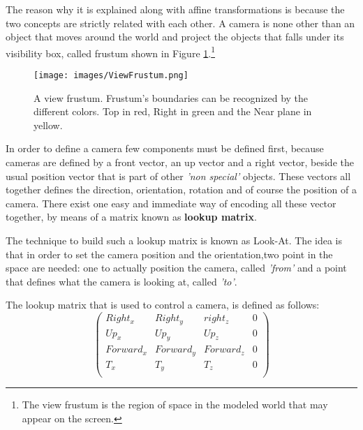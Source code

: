 \documentclass[12pt,a4paper]{extarticle}
\newcommand{\linespace}{\vspace{8pt}}
\begin{document}
The reason why it is explained along with affine transformations is because the two concepts are strictly related with each other. A camera is none other than an object that moves around the world and project the objects that falls under its visibility box, called frustum shown in Figure \ref{fig:viewfrustum}.\footnote{The view frustum is the region of space in the modeled world that may appear on the screen.} %
\begin{figure}[hbtp]
\centering
\texttt{[image: images/ViewFrustum.png]}
\caption{A view frustum. Frustum's boundaries can be recognized by the different colors. Top in red, Right in green and the Near plane in yellow. }
\label{fig:viewfrustum}
\end{figure}


In order to define a camera few components must be defined first, because cameras are defined by a front vector, an up vector and a right vector, beside the usual position vector that is part of other \textit{'non special'} objects. These vectors all together defines the direction, orientation, rotation and of course the position of a camera.
There exist one easy and immediate way of encoding all these vector together, by means of a matrix known as \textbf{lookup matrix}.
\linespace

The technique to build such a lookup matrix is known as Look-At. The idea is that in order to set the camera position and the orientation,two point in the space are needed: one to actually position the camera, called \textit{'from'} and a point that defines what the camera is looking at, called \textit{'to'}.

The lookup matrix that is used to control a camera, is defined as follows:
\[
\begin{pmatrix}
Right_{x} & Right_{y} & right_{z} & 0\\
Up_{x} & Up_{y} & Up_{z} & 0\\
Forward_{x} & Forward_{y} & Forward_{z} & 0\\
T_{x}& T_{y} & T_{z} & 0\\
\end{pmatrix}
\]
\end{document}
